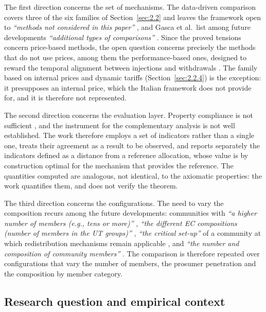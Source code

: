 The first direction concerns the set of mechanisms. The data-driven comparison covers three of the six families of Section~\ref{sec:2.2} and leaves the framework open to \textit{``methods not considered in this paper''} \cite{gonzalezAsenjo2026}, and Gasca et al.\ list among future developments \textit{``additional types of comparisons''} \cite{gasca2024}. Since the proved tensions concern price-based methods, the open question concerns precisely the methods that do not use prices, among them the performance-based ones, designed to reward the temporal alignment between injections and withdrawals \cite{gianaroli2024, giudice2026}. The family based on internal prices and dynamic tariffs (Section~\ref{sec:2.2.4}) is the exception: it presupposes an internal price, which the Italian framework does not provide for, and it is therefore not represented.

The second direction concerns the evaluation layer. Property compliance is not sufficient \cite{gonzalezAsenjo2026}, and the instrument for the complementary analysis is not well established. The work therefore employs a set of indicators rather than a single one, treats their agreement as a result to be observed, and reports separately the indicators defined as a distance from a reference allocation, whose value is by construction optimal for the mechanism that provides the reference. The quantities computed are analogous, not identical, to the axiomatic properties: the work quantifies them, and does not verify the theorem.

The third direction concerns the configurations. The need to vary the composition recurs among the future developments: communities with \textit{``a higher number of members (e.g., tens or more)''} \cite{volpato2024}, \textit{``the different EC compositions (number of members in the UT groups)''} \cite{minutoLanzini2022}, \textit{``the critical set-up''} of a community at which redistribution mechanisms remain applicable \cite{fina2024}, and \textit{``the number and composition of community members''} \cite{giudice2026}. The comparison is therefore repeated over configurations that vary the number of members, the prosumer penetration and the composition by member category.

\subsection*{Research question and empirical context}


